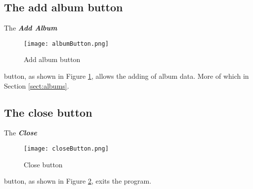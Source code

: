 \subsection{The add album button}
The 
\textbf{\textit{Add Album}}
\begin{figure}[!ht]
  \texttt{[image: albumButton.png]}
  \caption{Add album button}
  \label{fig:Add album button}
\end{figure}
button, as shown in Figure 
\ref{fig:Add album button},
allows the adding of album data.  More of which in Section 
\ref{sect:albums}.

\subsection{The close button}
The 
\textbf{\textit{Close}}
\begin{figure}[!ht]
  \texttt{[image: closeButton.png]}
  \caption{Close button}
  \label{fig:Close button}
\end{figure}button, as shown in Figure 
\ref{fig:Close button},
exits the program.
